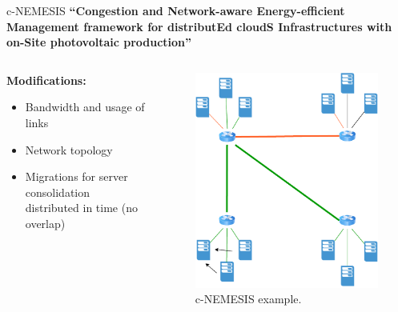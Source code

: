 \documentclass[Ligatures=TeX,table,svgnames,usetotalslideindicator,compress,10pt,aspectratio=169]{beamer}
\begin{document}
\addtocounter{framenumber}{-1}

\begin{frame}{c-NEMESIS}  
  \textbf {``\alert{Congestion} and \alert{N}etwork-aware \alert{E}nergy-efficient
    \alert{M}anagement framework for distribut\alert{E}d cloud\alert{S} \alert{I}nfrastructures with on-\alert{S}ite photovoltaic production''}
  \begin{columns}        
    \begin{column}{0.7\textwidth}
\small
\textbf{Modifications:}
\begin{itemize}
    \item Bandwidth and usage of links
    \item Network topology
    \item Migrations for server consolidation distributed in time (no overlap)

  \end{itemize}
  
\end{column}   

\begin{column}{0.3\textwidth}
      \begin{figure}[!h]
        \centering
        \includegraphics[width=.9\textwidth]{images/cnemesis_4.pdf}
        \caption{c-NEMESIS example.}
      \end{figure}
    \end{column}        

\end{columns}

\end{frame}
\end{document}
